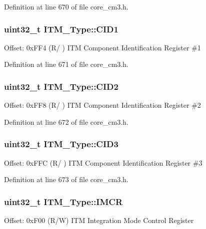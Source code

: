 Definition at line 670 of file core\+\_\+cm3.\+h.

\subsubsection[{\texorpdfstring{C\+I\+D1}{CID1}}]{ uint32\+\_\+t I\+T\+M\+\_\+\+Type\+::\+C\+I\+D1}\hypertarget{structITM__Type_a5f7d524b71f49e444ff0d1d52b3c3565}{}\label{structITM__Type_a5f7d524b71f49e444ff0d1d52b3c3565}
Offset\+: 0x\+F\+F4 (R/ ) I\+TM Component Identification Register \#1 

Definition at line 671 of file core\+\_\+cm3.\+h.

\subsubsection[{\texorpdfstring{C\+I\+D2}{CID2}}]{ uint32\+\_\+t I\+T\+M\+\_\+\+Type\+::\+C\+I\+D2}\hypertarget{structITM__Type_adee4ccce1429db8b5db3809c4539f876}{}\label{structITM__Type_adee4ccce1429db8b5db3809c4539f876}
Offset\+: 0x\+F\+F8 (R/ ) I\+TM Component Identification Register \#2 

Definition at line 672 of file core\+\_\+cm3.\+h.

\subsubsection[{\texorpdfstring{C\+I\+D3}{CID3}}]{ uint32\+\_\+t I\+T\+M\+\_\+\+Type\+::\+C\+I\+D3}\hypertarget{structITM__Type_a0e7aa199619cc7ac6baddff9600aa52e}{}\label{structITM__Type_a0e7aa199619cc7ac6baddff9600aa52e}
Offset\+: 0x\+F\+FC (R/ ) I\+TM Component Identification Register \#3 

Definition at line 673 of file core\+\_\+cm3.\+h.

\subsubsection[{\texorpdfstring{I\+M\+CR}{IMCR}}]{ uint32\+\_\+t I\+T\+M\+\_\+\+Type\+::\+I\+M\+CR}\hypertarget{structITM__Type_ab2e87d8bb0e3ce9b8e0e4a6a6695228a}{}\label{structITM__Type_ab2e87d8bb0e3ce9b8e0e4a6a6695228a}
Offset\+: 0x\+F00 (R/W) I\+TM Integration Mode Control Register 

